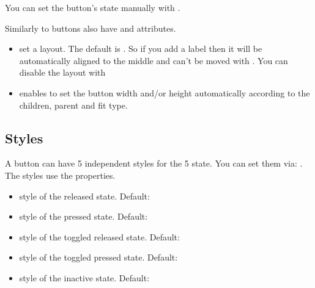\documentclass[letterpaper,10pt,english]{sphinxmanual}
\begin{document}
You can set the button’s state manually with .

Similarly to {\hyperref[\detokenize{object-types/cont::doc}]{}} buttons also have  and  attributes.
\begin{itemize}
\item {} 
set a layout. The default is .
So if you add a label then it will be automatically aligned to the middle and can’t be moved with .
You can disable the layout with 

\item {} 
 enables to set the button width and/or height automatically according to the children, parent and fit type.

\end{itemize}


\subsection{Styles}
\label{\detokenize{object-types/btn:styles}}
A button can have 5 independent styles for the 5 state. You can set them via: . The styles use the  properties.
\begin{itemize}
\item {} 
 style of the released state. Default: 

\item {} 
 style of the pressed state. Default: 

\item {} 
 style of the toggled released state. Default: 

\item {} 
 style of the toggled pressed state. Default: 

\item {} 
 style of the inactive state. Default: 

\end{itemize}
\end{document}
